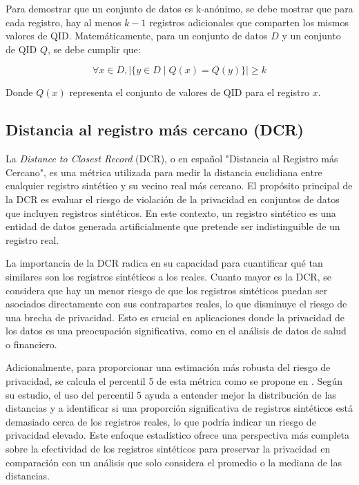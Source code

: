Para demostrar que un conjunto de datos es k-anónimo, se debe mostrar que para cada registro, hay al menos \( k-1 \) registros adicionales que comparten los mismos valores de QID. Matemáticamente, para un conjunto de datos \( D \) y un conjunto de QID \( Q \), se debe cumplir que:

\begin{equation}
    \forall x \in D, |\{ y \in D \mid Q(x) = Q(y) \}| \geq k
\end{equation}

Donde \( Q(x) \) representa el conjunto de valores de QID para el registro \( x \).

\subsection{Distancia al registro más cercano (DCR)}

La \emph{Distance to Closest Record} (DCR), o en español "Distancia al Registro más Cercano", es una métrica utilizada para medir la distancia euclidiana entre cualquier registro sintético y su vecino real más cercano. El propósito principal de la DCR es evaluar el riesgo de violación de la privacidad en conjuntos de datos que incluyen registros sintéticos. En este contexto, un registro sintético es una entidad de datos generada artificialmente que pretende ser indistinguible de un registro real.

La importancia de la DCR radica en su capacidad para cuantificar qué tan similares son los registros sintéticos a los reales. Cuanto mayor es la DCR, se considera que hay un menor riesgo de que los registros sintéticos puedan ser asociados directamente con sus contrapartes reales, lo que disminuye el riesgo de una brecha de privacidad. Esto es crucial en aplicaciones donde la privacidad de los datos es una preocupación significativa, como en el análisis de datos de salud o financiero.

Adicionalmente, para proporcionar una estimación más robusta del riesgo de privacidad, se calcula el percentil 5 de esta métrica como se propone en \cite{zhao_ctab-gan_2021}. Según su estudio, el uso del percentil 5 ayuda a entender mejor la distribución de las distancias y a identificar si una proporción significativa de registros sintéticos está demasiado cerca de los registros reales, lo que podría indicar un riesgo de privacidad elevado. Este enfoque estadístico ofrece una perspectiva más completa sobre la efectividad de los registros sintéticos para preservar la privacidad en comparación con un análisis que solo considera el promedio o la mediana de las distancias.


